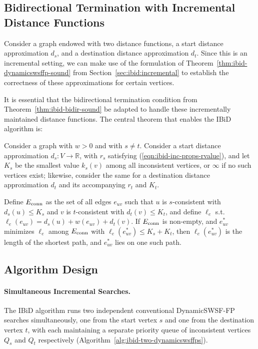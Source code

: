 \subsection{Bidirectional Termination with Incremental Distance Functions}

Consider a graph endowed with two distance functions,
a start distance approximation $d_s$,
and a destination distance approximation $d_t$.
Since this is an incremental setting,
we can make use of the formulation
of Theorem~\ref{thm:ibid-dynamicswsffp-sound}
from Section~\ref{sec:ibid:incremental}
to establish the correctness of these approximations
for certain vertices.

It is essential that the bidirectional termination condition from
Theorem~\ref{thm:ibid-bidir-sound} be adapted to
handle these incrementally maintained distance functions.
The central theorem that enables the IBiD algorithm is:

\begin{theorem}
Consider a graph with $w > 0$ and with $s \neq t$.
Consider a start distance approximation $d_s: V \rightarrow \mathbb{R}$,
with $r_s$ satisfying (\ref{eqn:ibid-inc-props-rvalue}),
and let $K_s$ be the smallest value $k_s(v)$
among all inconsistent vertices,
or $\infty$ if no such vertices exist;
likewise, consider the same for a destination distance approximation
$d_t$ and its accompanying $r_t$ and $K_t$.

Define $E_{\mbox{\scriptsize conn}}$ as the set of all edges $e_{uv}$ such that
$u$ is $s$-consistent with $d_s(u) \leq K_s$
and $v$ is $t$-consistent with $d_t(v) \leq K_t$,
and define $\ell_e$ s.t. $\ell_e(e_{uv}) = d_s(u) + w(e_{uv}) + d_t(v)$.
If $E_{\mbox{\scriptsize conn}}$ is non-empty,
and $e^*_{uv}$ minimizes $\ell_e$
among $E_{\mbox{\scriptsize conn}}$ with $\ell_e(e^*_{uv}) \leq K_s + K_t$,
then $\ell_e(e^*_{uv})$ is the length of the shortest path,
and $e^*_{uv}$ lies on one such path.
\label{thm:ibid-sound}
\end{theorem}

\subsection{Algorithm Design}

\paragraph{Simultaneous Incremental Searches.}
The IBiD algorithm runs two independent conventional
DynamicSWSF-FP \citep{ramalingam1996dynamicswsffp}
searches simultaneously,
one from the start vertex $s$
and one from the destination vertex $t$,
with each maintaining a separate priority queue of
inconsistent vertices $Q_s$ and $Q_t$ respectively
(Algorithm~\ref{alg:ibid-two-dynamicswsffps}).

